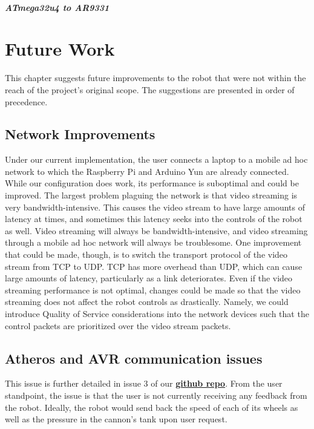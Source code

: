 \documentclass[letterpaper,12pt]{report}
\newcommand{\github}{\href{https://github.com/cometcannon/tshirt-cannon-robot}
        {\textbf{github repo}}}
\begin{document}
\paragraph{ATmega32u4 to AR9331}
\label{sec:mega_ath_msg}

\chapter{Future Work}

This chapter suggests future improvements to the robot that were not within the
reach of the project's original scope. The suggestions are presented in order
of precedence.

\section{Network Improvements}
Under our current implementation, the user connects a laptop to a mobile ad hoc
network to which the Raspberry Pi and Arduino Yun are already connected. While
our configuration does work, its performance is suboptimal and could be
improved. The largest problem plaguing the network is that video streaming is
very bandwidth-intensive. This causes the video stream to have large amounts of
latency at times, and sometimes this latency seeks into the controls of the
robot as well. Video streaming will always be bandwidth-intensive, and video
streaming through a mobile ad hoc network will always be troublesome. One
improvement that could be made, though, is to switch the transport protocol of
the video stream from TCP to UDP. TCP has more overhead than UDP, which can
cause large amounts of latency, particularly as a link deteriorates. Even if the
video streaming performance is not optimal, changes could be made so that the
video streaming does not affect the robot controls as drastically. Namely, we
could introduce Quality of Service considerations into the network devices such
that the control packets are prioritized over the video stream packets.

\section{Atheros and AVR communication issues}
This issue is further detailed in issue 3 of our \github.  From the user
standpoint, the issue is that the user is not currently receiving any feedback
from the robot. Ideally, the robot would send back the speed of each of its
wheels as well as the pressure in the cannon's tank upon user request.
\end{document}
